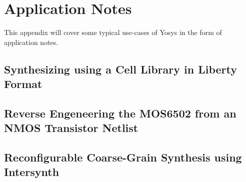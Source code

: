 
\chapter{Application Notes}
\label{chapter:appnotes}

\begin{fixme}
This appendix will cover some typical use-cases of Yosys in the form of application notes.
\end{fixme}

\section{Synthesizing using a Cell Library in Liberty Format}
\section{Reverse Engeneering the MOS6502 from an NMOS Transistor Netlist}
\section{Reconfigurable Coarse-Grain Synthesis using Intersynth}


